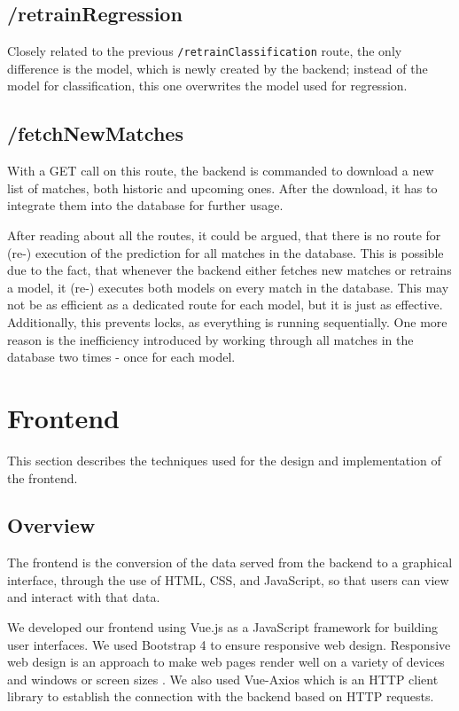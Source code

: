 \subsection{/retrainRegression}
Closely related to the previous \lstinline[columns=fixed]{/retrainClassification} route, the only difference is the model, which is newly created by the backend; instead of the model for classification, this one overwrites the model used for regression.

\subsection{/fetchNewMatches}
With a GET call on this route, the backend is commanded to download a new list of matches, both historic and upcoming ones. After the download, it has to integrate them into the database for further usage.

After reading about all the routes, it could be argued, that there is no route for (re-) execution of the prediction for all matches in the database. This is possible due to the fact, that whenever the backend either fetches new matches or retrains a model, it (re-) executes both models on every match in the database. This may not be as efficient as a dedicated route for each model, but it is just as effective. Additionally, this prevents locks, as everything is running sequentially. One more reason is the inefficiency introduced by working through all matches in the database two times - once for each model.

\section{Frontend}
This section describes the techniques used for the design and implementation of the frontend.
\subsection{Overview}
The frontend is the conversion of the data served from the backend to a graphical interface,
through the use of HTML, CSS, and JavaScript, so that users can view and interact with that data.

We developed our frontend using Vue.js as a JavaScript framework for building user interfaces.
We used Bootstrap 4 to ensure responsive web design. Responsive web design is an approach to make web pages render well on a variety of devices and windows or screen sizes \cite{responsive:2011}. 
We also used Vue-Axios which is an HTTP client library to establish the connection with the backend based on HTTP requests. 

